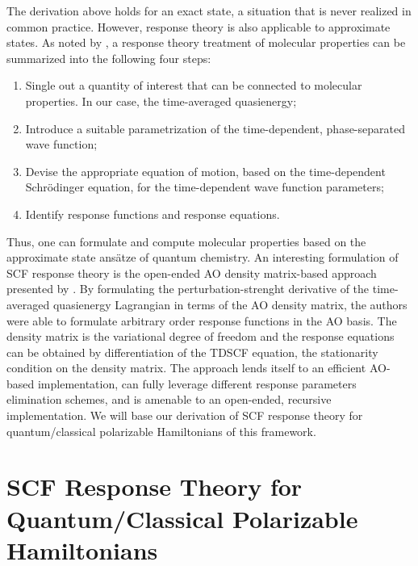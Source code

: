 The derivation above holds for an exact state, a situation that is never
realized in common practice. However, response theory is
also applicable to approximate states.
As noted by \citeauthor{Norman2011-ad}, a response theory treatment of
molecular properties can be summarized into the following four
steps:\autocite{Norman2011-ad}
\begin{enumerate}
    \item Single out a quantity of interest that can be connected to
      molecular properties. In our case, the time-averaged
      quasienergy;
    \item Introduce a suitable parametrization of the time-dependent,
      phase-separated wave function;
    \item Devise the appropriate equation of motion, based on the
      time-dependent Schr\"{o}dinger equation, for the time-dependent
      wave function parameters;
    \item Identify response functions and response equations.
\end{enumerate}
Thus, one can formulate and compute molecular properties based on
the approximate state ans\"{a}tze of quantum chemistry.
An interesting formulation of \acrshort{SCF} response theory is the
open-ended \acrshort{AO} density matrix-based approach presented by
\citeauthor{Thorvaldsen2008-sg}.\autocite{Thorvaldsen2008-sg}
By formulating the perturbation-strenght derivative of the time-averaged
quasienergy Lagrangian in terms of the \acrshort{AO} density matrix,
the authors were able to formulate arbitrary order response functions
in the \acrshort{AO} basis.
The density matrix is the variational degree of freedom and the response
equations can be obtained by differentiation of the \gls{TDSCF}
equation, the stationarity condition on the density matrix.
The approach lends itself to an efficient \acrshort{AO}-based
implementation,\autocite{Larsen2000-hj, Kjaergaard2008-hy} can fully
leverage different response parameters elimination
schemes,\autocite{Thorvaldsen2008-sg, Kristensen2008-hv} and is amenable
to an open-ended, recursive implementation.\autocite{Ringholm2014-gx,
Friese2015-kb, Friese2015-bu}
We will base our derivation of \acrshort{SCF} response theory for
quantum/classical polarizable Hamiltonians of this framework.

\section{SCF Response Theory for Quantum/Classical Polarizable Hamiltonians}\label{sec:csm-response}

